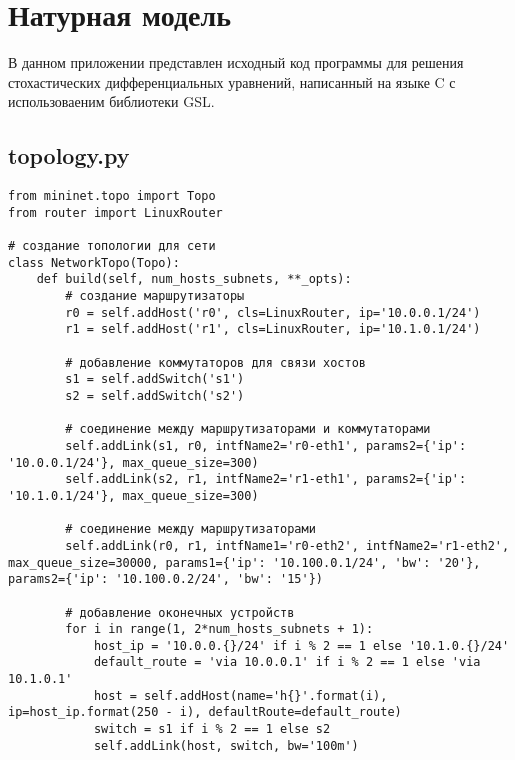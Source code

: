 \chapter{Натурная модель}

В данном приложении представлен исходный код программы
для решения стохастических дифференциальных уравнений,
написанный на языке C с использоваеним библиотеки GSL.

\section*{topology.py}
\begin{verbatim}
from mininet.topo import Topo
from router import LinuxRouter

# создание топологии для сети
class NetworkTopo(Topo):
    def build(self, num_hosts_subnets, **_opts):
        # создание маршрутизаторы
        r0 = self.addHost('r0', cls=LinuxRouter, ip='10.0.0.1/24')
        r1 = self.addHost('r1', cls=LinuxRouter, ip='10.1.0.1/24')

        # добавление коммутаторов для связи хостов
        s1 = self.addSwitch('s1')
        s2 = self.addSwitch('s2')

        # соединение между маршрутизаторами и коммутаторами
        self.addLink(s1, r0, intfName2='r0-eth1', params2={'ip': '10.0.0.1/24'}, max_queue_size=300)
        self.addLink(s2, r1, intfName2='r1-eth1', params2={'ip': '10.1.0.1/24'}, max_queue_size=300)

        # соединение между маршрутизаторами
        self.addLink(r0, r1, intfName1='r0-eth2', intfName2='r1-eth2', max_queue_size=30000, params1={'ip': '10.100.0.1/24', 'bw': '20'}, params2={'ip': '10.100.0.2/24', 'bw': '15'})

        # добавление оконечных устройств
        for i in range(1, 2*num_hosts_subnets + 1):
            host_ip = '10.0.0.{}/24' if i % 2 == 1 else '10.1.0.{}/24'
            default_route = 'via 10.0.0.1' if i % 2 == 1 else 'via 10.1.0.1'
            host = self.addHost(name='h{}'.format(i), ip=host_ip.format(250 - i), defaultRoute=default_route)
            switch = s1 if i % 2 == 1 else s2
            self.addLink(host, switch, bw='100m')
\end{verbatim}

